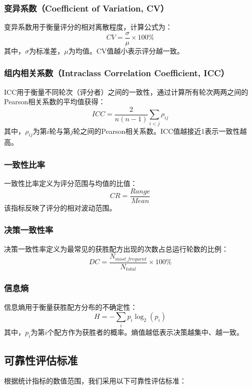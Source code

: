 \documentclass[12pt,a4paper]{article}
\begin{document}
\subsubsection{变异系数（Coefficient of Variation, CV）}
变异系数用于衡量评分的相对离散程度，计算公式为：
\begin{equation}
    CV = \frac{\sigma}{\mu} \times 100\%
\end{equation}
其中，$\sigma$为标准差，$\mu$为均值。CV值越小表示评分越一致。

\subsubsection{组内相关系数（Intraclass Correlation Coefficient, ICC）}
ICC用于衡量不同轮次（评分者）之间的一致性，通过计算所有轮次两两之间的Pearson相关系数的平均值获得：
\begin{equation}
    ICC = \frac{2}{n(n-1)}\sum_{i<j} \rho_{ij}
\end{equation}
其中，$\rho_{ij}$为第$i$轮与第$j$轮之间的Pearson相关系数。ICC值越接近1表示一致性越高。

\subsubsection{一致性比率}
一致性比率定义为评分范围与均值的比值：
\begin{equation}
    CR = \frac{Range}{Mean}
\end{equation}
该指标反映了评分的相对波动范围。

\subsubsection{决策一致性率}
决策一致性率定义为最常见的获胜配方出现的次数占总运行轮数的比例：
\begin{equation}
    DC = \frac{N_{most\_frequent}}{N_{total}} \times 100\%
\end{equation}

\subsubsection{信息熵}
信息熵用于衡量获胜配方分布的不确定性：
\begin{equation}
    H = -\sum_{i} p_i \log_2(p_i)
\end{equation}
其中，$p_i$为第$i$个配方作为获胜者的概率。熵值越低表示决策越集中、越一致。

\subsection{可靠性评估标准}
根据统计指标的数值范围，我们采用以下可靠性评估标准：
\end{document}
